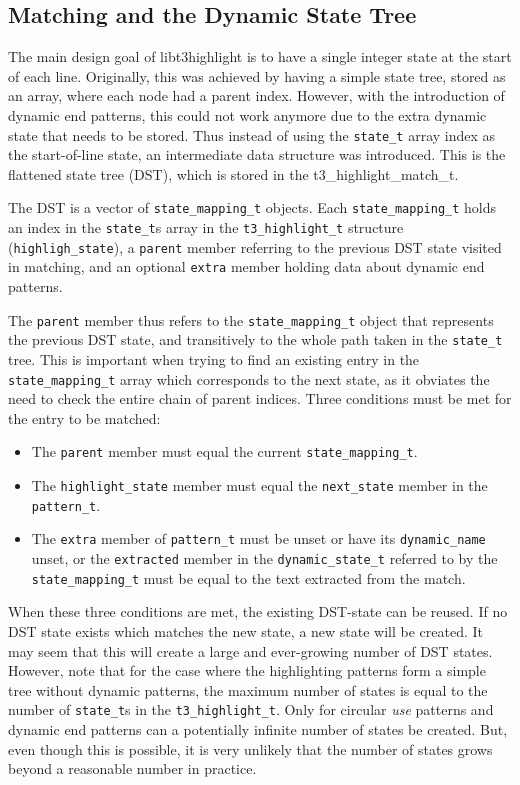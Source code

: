\documentclass[a4paper]{article}
\begin{document}
\begin{multicols}{2}
\section{Matching and the Dynamic State Tree\label{sec:state-tree}}
The main design goal of libt3highlight is to have a single integer state at the
start of each line. Originally, this was achieved by having a simple state
tree, stored as an array, where each node had a parent index. However, with the
introduction of dynamic end patterns, this could not work anymore due to the
extra dynamic state that needs to be stored. Thus instead of using the
{\tt state_t} array index as the start-of-line state, an intermediate data
structure was introduced. This is the flattened state tree (DST), which is
stored in the t3_highlight_match_t.

The DST is a vector of {\tt state_mapping_t} objects. Each
{\tt state_mapping_t} holds an index in the {\tt state_t}s array in the
{\tt t3_highlight_t} structure ({\tt highligh_state}), a {\tt parent} member
referring to the previous DST state visited in matching, and an optional
{\tt extra} member holding data about dynamic end patterns.

The {\tt parent} member thus refers to the {\tt state_mapping_t} object that
represents the previous DST state, and transitively to the whole path taken in
the {\tt state_t} tree. This is important when trying to find an existing entry
in the {\tt state_mapping_t} array which corresponds to the next state, as it
obviates the need to check the entire chain of parent indices. Three conditions
must be met for the entry to be matched:

\begin{itemize}
\item The {\tt parent} member must equal the current {\tt state_mapping_t}.
\item The {\tt highlight_state} member must equal the {\tt next_state} member
	in the {\tt pattern_t}.
\item The {\tt extra} member of {\tt pattern_t} must be unset or have its
	{\tt dynamic_name} unset, or the {\tt extracted} member in the
	{\tt dynamic_state_t} referred to by the {\tt state_mapping_t} must be
	equal to the text extracted from the match.
\end{itemize}

When these three conditions are met, the existing DST-state can be reused. If
no DST state exists which matches the new state, a new state will be created.
It may seem that this will create a large and ever-growing number of DST states.
However, note that for the case where the highlighting patterns form a simple
tree without dynamic patterns, the maximum number of states is equal to the
number of {\tt state_t}s in the {\tt t3_highlight_t}. Only for circular {\it use}
patterns and dynamic end patterns can a potentially infinite number of states
be created. But, even though this is possible, it is very unlikely that the
number of states grows beyond a reasonable number in practice.


\end{multicols}
\end{document}
